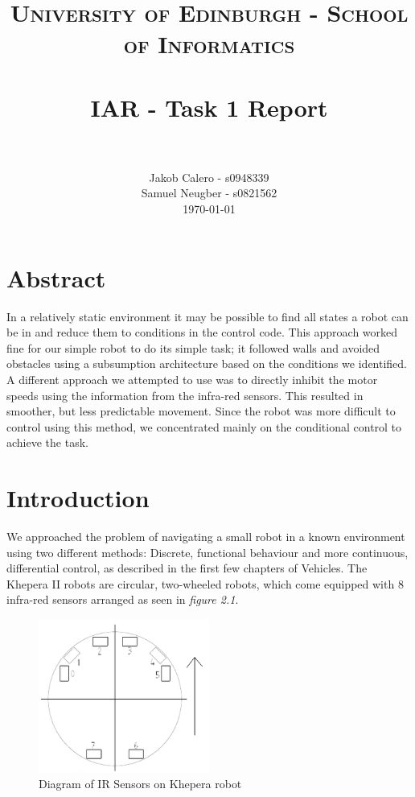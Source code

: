 \documentclass[paper=a4, fontsize=12pt]{scrartcl}	%
\title{
\vspace{-1in} 	
\usefont{OT1}{bch}{b}{n}
\normalfont \normalsize \textsc{University of Edinburgh - School of Informatics} \\ [25pt]
\horrule{0.5pt} \\[0.4cm]
\large IAR - Task 1 Report \\
\horrule{1pt} \\[0.5cm]
}
\author{
  \normalfont \normalsize
  Jakob Calero - s0948339\\[-3pt]\normalsize
  Samuel Neugber - s0821562\\[-3pt]\normalsize
  \today
}
\date{}
\numberwithin{equation}{section}		%
\numberwithin{figure}{section}			%
\numberwithin{table}{section}				%
\begin{document}
\maketitle					%
\section{Abstract}
In a relatively static environment it may be possible to find all states a robot can be in and reduce them to conditions in the control code. This approach worked fine for our simple robot to do its simple task; it followed walls and avoided obstacles using a subsumption architecture based on the conditions we identified. A different approach we attempted to use was to directly inhibit the motor speeds using the information from the infra-red sensors. This resulted in smoother, but less predictable movement. Since the robot was more difficult to control using this method, we concentrated mainly on the conditional control to achieve the task.

\section{Introduction}
We approached the problem of navigating a small robot in a known environment using two different methods: Discrete, functional behaviour and more continuous, differential control, as described in the first few chapters of Vehicles\cite{vehicles}. The Khepera II robots are circular, two-wheeled robots, which come equipped with 8 infra-red sensors arranged as seen in \emph{figure 2.1}. 
\begin{figure}[!ht]
 \centering
  \includegraphics[width=0.5\textwidth]{IRSensors}
  \caption{Diagram of IR Sensors on Khepera robot}
\end{figure}
\end{document}
